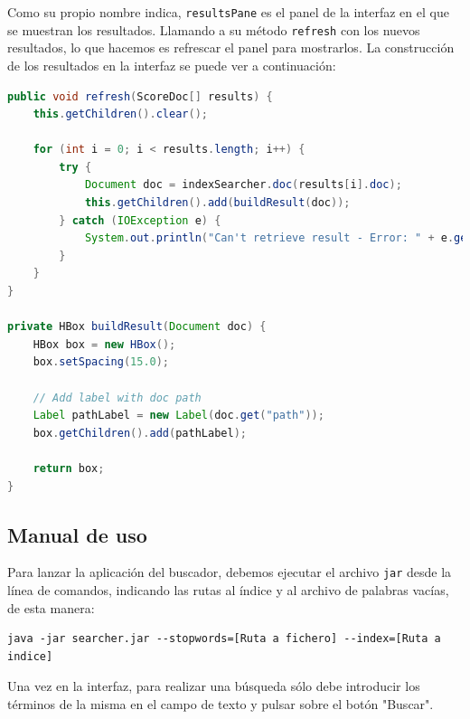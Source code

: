 Como su propio nombre indica, \verb|resultsPane| es el panel de la interfaz en el que se muestran los resultados. Llamando a su método \verb|refresh| con los nuevos resultados, lo que hacemos es refrescar el panel para mostrarlos. La construcción de los resultados en la interfaz se puede ver a continuación:

\begin{lstlisting}[language=Java]
public void refresh(ScoreDoc[] results) {
    this.getChildren().clear();

    for (int i = 0; i < results.length; i++) {
        try {
            Document doc = indexSearcher.doc(results[i].doc);
            this.getChildren().add(buildResult(doc));
        } catch (IOException e) {
            System.out.println("Can't retrieve result - Error: " + e.getMessage());
        }
    }
}

private HBox buildResult(Document doc) {
    HBox box = new HBox();
    box.setSpacing(15.0);

    // Add label with doc path
    Label pathLabel = new Label(doc.get("path"));
    box.getChildren().add(pathLabel);

    return box;
}
\end{lstlisting}

\subsection{Manual de uso}

Para lanzar la aplicación del buscador, debemos ejecutar el archivo \verb|jar| desde la línea de comandos, indicando las rutas al índice y al archivo de palabras vacías, de esta manera:

\begin{lstlisting}
java -jar searcher.jar --stopwords=[Ruta a fichero] --index=[Ruta a indice]
\end{lstlisting}

Una vez en la interfaz, para realizar una búsqueda sólo debe introducir los términos de la misma en el campo de texto y pulsar sobre el botón "Buscar".